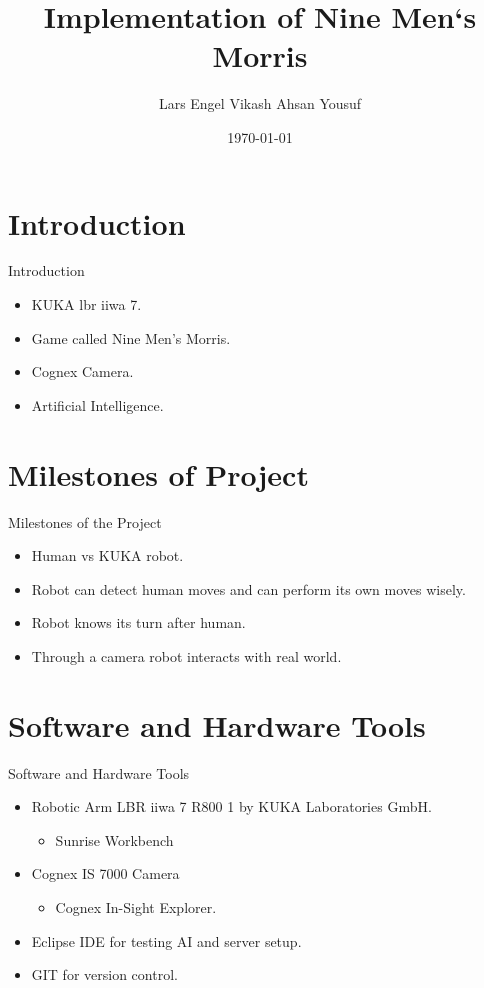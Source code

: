 \documentclass{beamer}
\title{Implementation of Nine Men`s Morris}
\author{Lars Engel \newline Vikash \newline Ahsan Yousuf}
\institute{Fachhochschule Kiel}
\date{\today}
\begin{document}

\begin{frame}
\titlepage
\end{frame}


\section{Introduction}
\begin{frame}{Introduction }
\begin{itemize}
\item KUKA lbr iiwa 7.
\item Game called Nine Men's Morris.
\item Cognex Camera.
\item Artificial Intelligence.
\end{itemize}
\end{frame}

\section{Milestones of Project}
\begin{frame}{Milestones of the Project}
\begin{itemize}
\item Human vs KUKA robot.  
\item Robot can detect human moves and can perform its own moves wisely.
\item Robot knows its turn after human.
\item Through a camera robot interacts with real world.
\end{itemize}
\end{frame}

\section{Software and Hardware Tools}
\begin{frame}{Software and Hardware Tools}
\begin{itemize}
\item Robotic Arm LBR iiwa 7 R800 1 by KUKA Laboratories GmbH.
\begin{itemize}
\item Sunrise Workbench
\end{itemize}
\item Cognex IS 7000 Camera
\begin{itemize}
\item Cognex In-Sight Explorer.
\end{itemize}
\vspace{\baselineskip}
\item Eclipse IDE for testing AI and server setup.
\item GIT for version control.
\end{itemize}
\end{frame}
\end{document}
